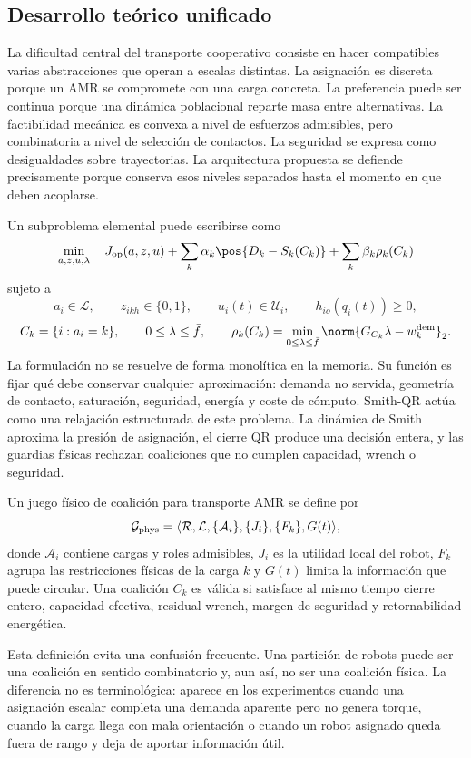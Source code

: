 \subsection{Desarrollo teórico unificado}

La dificultad central del transporte cooperativo consiste en hacer compatibles varias
abstracciones que operan a escalas distintas. La asignación es discreta porque un AMR se
compromete con una carga concreta. La preferencia puede ser continua porque una dinámica
poblacional reparte masa entre alternativas. La factibilidad mecánica es convexa a nivel
de esfuerzos admisibles, pero combinatoria a nivel de selección de contactos. La
seguridad se expresa como desigualdades sobre
trayectorias. La arquitectura propuesta se defiende precisamente porque conserva esos
niveles separados hasta el momento en que deben acoplarse.

Un subproblema elemental puede escribirse como
\[
  \min_{a,z,u,\lambda}
  \quad
  J_{\rm op}(a,z,u)
  + \sum_{k}\alpha_k\pos{D_k-S_k(C_k)}
  + \sum_{k}\beta_k\rho_k(C_k)
\]
sujeto a
\[
  a_i\in\mathcal L,\qquad
  z_{ikh}\in\{0,1\},\qquad
  u_i(t)\in\mathcal U_i,\qquad
  h_{io}(q_i(t))\geq 0,
\]
\[
  C_k=\{i:a_i=k\},\qquad
  0\leq\lambda\leq\bar f,\qquad
  \rho_k(C_k)=
  \min_{0\leq\lambda\leq\bar f}
  \norm{G_{C_k}\lambda-w_k^{\rm dem}}_2 .
\]
La formulación no se resuelve de forma monolítica en la memoria. Su función es fijar qué
debe conservar cualquier aproximación: demanda no servida, geometría de contacto,
saturación, seguridad, energía y coste de cómputo. Smith-QR actúa como una relajación
estructurada de este problema. La dinámica de Smith aproxima la presión de asignación,
el cierre QR produce una decisión entera, y las guardias físicas rechazan coaliciones que
no cumplen capacidad, wrench o seguridad.

\begin{definicion}
Un juego físico de coalición para transporte AMR se define por
\[
  \mathcal G_{\rm phys} =
  \langle \mathcal R,\mathcal L,\{\mathcal A_i\},\{J_i\},
  \{F_k\},G(t)\rangle ,
\]
donde $\mathcal A_i$ contiene cargas y roles admisibles, $J_i$ es la utilidad local del
robot, $F_k$ agrupa las restricciones físicas de la carga $k$ y $G(t)$ limita la
información que puede circular. Una coalición $C_k$ es válida si satisface al mismo
tiempo cierre entero, capacidad efectiva, residual wrench, margen de seguridad y
retornabilidad energética.
\end{definicion}

Esta definición evita una confusión frecuente. Una partición de robots puede ser una
coalición en sentido combinatorio y, aun así, no ser una coalición física. La diferencia
no es terminológica: aparece en los experimentos cuando una asignación escalar completa
una demanda aparente pero no genera torque, cuando la carga llega con mala orientación o
cuando un robot asignado queda fuera de rango y deja de aportar información útil.

